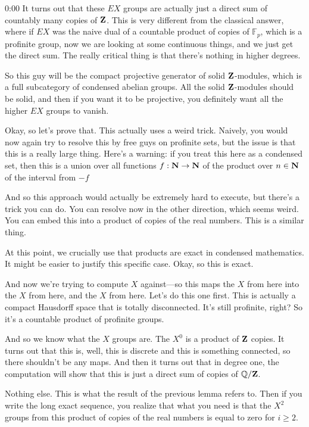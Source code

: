 \begin{unfinished}{0:00}
It turns out that these $EX$ groups are actually just a direct sum of countably many copies of $\mathbf Z$. This is very different from the classical answer, where if $EX$ was the naive dual of a countable product of copies of $\mathbb{F}_p$, which is a profinite group, now we are looking at some continuous things, and we just get the direct sum. The really critical thing is that there's nothing in higher degrees.

So this guy will be the compact projective generator of solid $\mathbf Z$-modules, which is a full subcategory of condensed abelian groups. All the solid $\mathbf Z$-modules should be solid, and then if you want it to be projective, you definitely want all the higher $EX$ groups to vanish.

Okay, so let's prove that. This actually uses a weird trick. Naively, you would now again try to resolve this by free guys on profinite sets, but the issue is that this is a really large thing. Here's a warning: if you treat this here as a condensed set, then this is a union over all functions $f: \mathbf N \to \mathbf N$ of the product over $n \in \mathbf N$ of the interval from $-f$

And so this approach would actually be extremely hard to execute, but there's a trick you can do. You can resolve now in the other direction, which seems weird. You can embed this into a product of copies of the real numbers. This is a similar thing.

At this point, we crucially use that products are exact in condensed mathematics. It might be easier to justify this specific case. Okay, so this is exact.

And now we're trying to compute $X$ against---so this maps the $X$ from here into the $X$ from here, and the $X$ from here. Let's do this one first. This is actually a compact Hausdorff space that is totally disconnected. It's still profinite, right? So it's a countable product of profinite groups.

And so we know what the $X$ groups are. The $X^0$ is a product of $\mathbf Z$ copies. It turns out that this is, well, this is discrete and this is something connected, so there shouldn't be any maps. And then it turns out that in degree one, the computation will show that this is just a direct sum of copies of $\mathbb{Q}/\mathbf Z$.

Nothing else. This is what the result of the previous lemma refers to. Then if you write the long exact sequence, you realize that what you need is that the $X^2$ groups from this product of copies of the real numbers is equal to zero for $i \geq 2$.


\end{unfinished}
